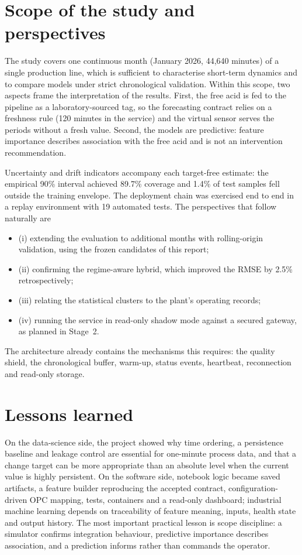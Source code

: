 \section{Scope of the study and perspectives}
The study covers one continuous month (January 2026, 44,640 minutes) of a single production line, which is sufficient to characterise short-term dynamics and to compare models under strict chronological validation. Within this scope, two aspects frame the interpretation of the results. First, the free acid is fed to the pipeline as a laboratory-sourced tag, so the forecasting contract relies on a freshness rule (120 minutes in the service) and the virtual sensor serves the periods without a fresh value. Second, the models are predictive: feature importance describes association with the free acid and is not an intervention recommendation.

Uncertainty and drift indicators accompany each target-free estimate: the empirical 90\% interval achieved 89.7\% coverage and 1.4\% of test samples fell outside the training envelope. The deployment chain was exercised end to end in a replay environment with 19 automated tests. The perspectives that follow naturally are 
\begin{itemize}
  \item (i) extending the evaluation to additional months with rolling-origin validation, using the frozen candidates of this report; 
  \item (ii) confirming the regime-aware hybrid, which improved the RMSE by 2.5\% retrospectively; 
  \item (iii) relating the statistical clusters to the plant's operating records;
  \item (iv) running the service in read-only shadow mode against a secured gateway, as planned in Stage~2. 
\end{itemize}
The architecture already contains the mechanisms this requires: the quality shield, the chronological buffer, warm-up, status events, heartbeat, reconnection and read-only storage.

\section{Lessons learned}
On the data-science side, the project showed why time ordering, a persistence baseline and leakage control are essential for one-minute process data, and that a change target can be more appropriate than an absolute level when the current value is highly persistent. On the software side, notebook logic became saved artifacts, a feature builder reproducing the accepted contract, configuration-driven OPC mapping, tests, containers and a read-only dashboard; industrial machine learning depends on traceability of feature meaning, inputs, health state and output history. The most important practical lesson is scope discipline: a simulator confirms integration behaviour, predictive importance describes association, and a prediction informs rather than commands the operator.
